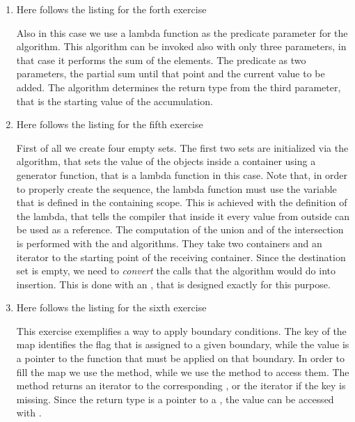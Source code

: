 \begin{enumerate}
    \item Here follows the listing for the forth exercise
    \lstset{basicstyle=\scriptsize\sf}
    
    \lstset{basicstyle=\sf}
    Also in this case we use a lambda function as the predicate parameter for
    the  algorithm. This algorithm can be invoked also with only
    three parameters, in that case it performs the sum of the elements. The
    predicate as two parameters, the partial sum until that point and the
    current value to be added. The algorithm determines the return type from the
    third parameter, that is the starting value of the accumulation.
		
    \item Here follows the listing for the fifth exercise 
    \lstset{basicstyle=\scriptsize\sf}
    
    \lstset{basicstyle=\sf}
    First of all we create four empty sets. The first two sets are initialized
    via the  algorithm, that sets the value of the objects
    inside a container using a generator function, that is a lambda function
    in this case. Note that, in order to properly create the sequence, the
    lambda function must use the  variable that is defined in the
    containing scope. This is achieved with the \cpp{[&]} definition of the
    lambda, that tells the compiler that inside it every value from outside can
    be used as a reference. The computation of the union and of the intersection
    is performed with the  and  algorithms.
    They take two containers and an iterator to the starting point of the
    receiving container. Since the destination set is empty, we need to
    \emph{convert} the calls that the algorithm would do into insertion. This is
    done with an , that is designed exactly for this
    purpose.
		
    \item Here follows the listing for the sixth exercise 
    \lstset{basicstyle=\scriptsize\sf}
    
    \lstset{basicstyle=\sf}
    This exercise exemplifies a way to apply boundary conditions. The key of the
    map identifies the flag that is assigned to a given boundary, while the
    value is a pointer to the function that must be applied on that boundary. In
    order to fill the map we use the  method, while we use the
     method to access them. The  method returns an iterator
    to the corresponding , or the  iterator if the key is
    missing. Since the return type is a pointer to a , the value can
    be accessed with .
	

\end{enumerate}
